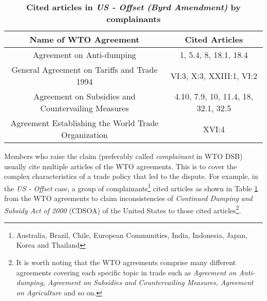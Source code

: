 \begin{table}[t!]
   \setlength\tabcolsep{15pt}
   \begin{tabular}{ c | c }
       \hline
       \textbf{\normalsize Name of WTO Agreement}          & \textbf{\normalsize Cited Articles} \\
       \hline \hline
       Agreement on Anti-dumping                           & 1, 5.4, 8, 18.1, 18.4               \\ \hline
       General Agreement on Tariffs and Trade 1994         & VI:3, X:3, XXIII:1, VI:2            \\ \hline
       Agreement on Subsidies and Countervailing Measures  & 4.10, 7.9, 10, 11.4, 18, 32.1, 32.5 \\ \hline
       Agreement Establishing the World Trade Organization & XVI:4                               \\ \hline
   \end{tabular}
   \caption{\textbf{Cited articles in \textit{US - Offset (Byrd Amendment)} by complainants}}
   \label{xltabular:cited-article-for-us-offset}
\end{table}

Members who raise the claim (preferably called \textit{complainant} in WTO DSB) usually cite multiple articles of the WTO agreements. This is to cover the complex characteristics of a trade policy that led to the dispute.
For example, in the
\textit{US - Offset} case,
a group of complainants\footnote{Australia,
   Brazil,
   Chile,
   European Communities,
   India,
   Indonesia,
   Japan,
   Korea and Thailand}
cited articles as shown in Table \ref{xltabular:cited-article-for-us-offset} from the WTO agreements to claim inconsistencies of \textit{Continued Dumping and Subsidy Act of 2000} (CDSOA) of the United States to those cited articles\footnote{It is worth noting that the WTO agreements comprise many different agreements covering each specific topic in trade such as \textit{Agreement on Anti-dumping, Agreement on Subsidies and Countervailing Measures, Agreement on Agriculture} and so on.}.

